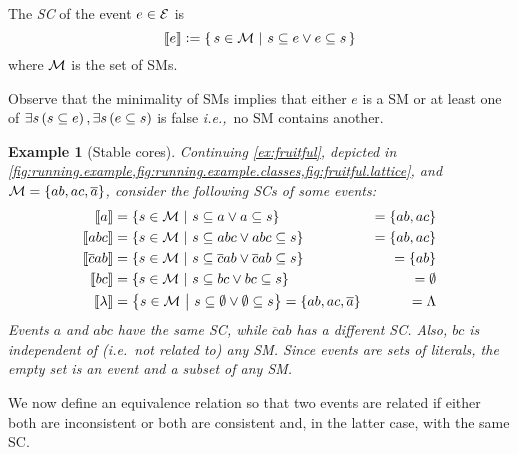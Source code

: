 \documentclass{tlp}
\newtheorem{example}{Example}
\newcommand{\cla}[1]{\ensuremath{{\cal #1}}}        %
\newcommand{\co}[1]{\ensuremath{\overline{#1}}}     %
\newcommand{\MODELset}{\ensuremath{\cla{M}}}
\newcommand{\EVENTSset}{\ensuremath{\cla{E}}}
\newcommand{\stablecore}[1]{\ensuremath{\left\llbracket #1 \right\rrbracket}}
\newcommand{\given}{\ensuremath{~\middle|~}}
\newcommand{\bottomclass}{\ensuremath{\Lambda}}
\newcommand{\emptyevent}{\ensuremath{\lambda}}
\begin{document}
The \textit{\acf{SC}} of the event \(e\in \EVENTSset\) is
\begin{equation}
    \stablecore{e} := \set{\, s \in \MODELset \given s \subseteq e \vee e \subseteq s\, } \label{eq:stable.core}
\end{equation}
where \(\MODELset\) is the set of \aclp{SM}.

Observe that the minimality of \aclp{SM} implies that either \(e\) is
a \acl{SM} or at least one of
$\exists s \del{s \subseteq e}, \exists s \del{e \subseteq s}$ is
false \emph{i.e.,}\ no \acl{SM} contains another.

\begin{example}[Stable cores]
\label{ex:stable.cores}\em
Continuing \cref{ex:fruitful}, depicted in
\cref{fig:running.example,fig:running.example.classes,fig:fruitful.lattice},
and \(\MODELset = \set{ab, ac, \co{a}}\), consider the following
\aclp{SC} of some events:
\begin{equation*}
  \begin{aligned}
            \stablecore{a}         & = \set{s \in \MODELset \given s \subseteq a \vee a \subseteq s}                                        & = \set{ab, ac} \\
            \stablecore{abc}       & = \set{s \in \MODELset \given s \subseteq abc \vee abc \subseteq s}                                    & = \set{ab, ac} \\
            \stablecore{\co{c}ab}  & = \set{s \in \MODELset \given s \subseteq \co{c}ab \vee \co{c}ab \subseteq s}                          & = \set{ab}     \\
            \stablecore{bc}        & = \set{s \in \MODELset \given s \subseteq bc \vee bc \subseteq s}                                      & = \emptyset    \\
            \stablecore{\emptyevent} & = \set{s \in \MODELset \given s \subseteq \emptyset \vee \emptyset \subseteq s} = \set{ab, ac, \co{a}} & = \bottomclass \\
  \end{aligned}
\end{equation*}
Events \(a\) and \(abc\) have the same \ac{SC}, while \(\co{c}ab\) has
a different \ac{SC}.  Also, \(bc\) is \emph{independent of}
(\emph{i.e.}\ not related to) any \acl{SM}.  Since events are sets of
literals, the empty set is an event and a subset of any \ac{SM}.
\end{example}

We now define an equivalence relation so that two events are related
if either both are inconsistent or both are consistent and, in the
latter case, with the same \acl{SC}.
\end{document}
